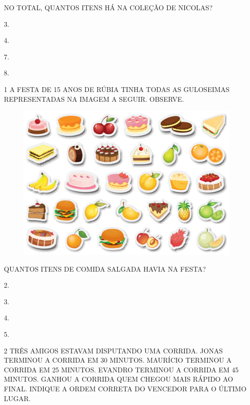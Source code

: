 NO TOTAL, QUANTOS ITENS HÁ NA COLEÇÃO DE NICOLAS?

\begin{escolha}[itemsep=0pt]
\item 3.

\item 4.

\item 7.

\item 8.
\end{escolha}



\num{1} A FESTA DE 15 ANOS DE RÚBIA TINHA TODAS AS GULOSEIMAS REPRESENTADAS
NA IMAGEM A SEGUIR. OBSERVE.

\begin{figure}[htpb!]
\centering
\includegraphics[width=.5\textwidth]{./media/SAEB_1ANO_MAT_FIGURA136.png}
\end{figure}

QUANTOS ITENS DE COMIDA SALGADA HAVIA NA FESTA?

\begin{escolha}[itemsep=0pt]
\item 2.

\item 3.

\item 4.

\item 5.
\end{escolha}

\num{2} TRÊS AMIGOS ESTAVAM DISPUTANDO UMA CORRIDA. JONAS TERMINOU A CORRIDA EM 30
MINUTOS. MAURÍCIO TERMINOU A CORRIDA EM 25 MINUTOS. EVANDRO TERMINOU A
CORRIDA EM 45 MINUTOS. GANHOU A CORRIDA QUEM CHEGOU MAIS RÁPIDO AO FINAL. INDIQUE A
ORDEM CORRETA DO VENCEDOR PARA O ÚLTIMO LUGAR.

